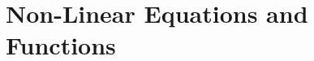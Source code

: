 \documentclass[../satmath.tex]{subfiles}
\begin{document}
\chapter{Non-Linear Equations and Functions}
\end{document}
